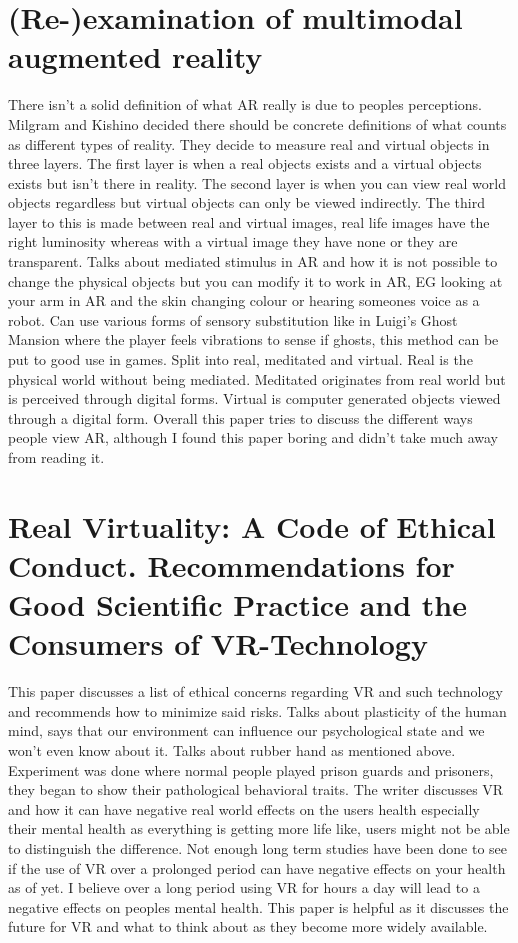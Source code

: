\documentclass{scrartcl}
\begin{document}
\section{(Re-)examination of multimodal augmented reality \cite{rosa2016re} }
There isn't a solid definition of what AR really is due to peoples perceptions. Milgram and Kishino decided there should be concrete definitions of what counts as different types of reality. They decide to measure real and virtual objects in three layers. The first layer is when a real objects exists and a virtual objects exists but isn't there in reality. The second layer is when you can view real world objects regardless but virtual objects can only be viewed indirectly. The third layer to this is made between real and virtual images, real life images have the right luminosity whereas with a virtual image they have none or they are transparent. Talks about mediated stimulus in AR and how it is not possible to change the physical objects but you can modify it to work in AR, EG looking at your arm in AR and the skin changing colour or hearing someones voice as a robot. Can use various forms of sensory substitution like in Luigi's Ghost Mansion where the player feels vibrations to sense if ghosts, this method can be put to good use in games. Split into real, meditated and virtual. Real is the physical world without being mediated. Meditated originates from real world but is perceived through digital forms. Virtual is computer generated objects viewed through a digital form. Overall this paper tries to discuss the different ways people view AR, although I found this paper boring and didn't take much away from reading it.

\section{Real Virtuality: A Code of Ethical Conduct. Recommendations for Good Scientific Practice and the Consumers of VR-Technology \cite{madary2016real} }
This paper discusses a list of ethical concerns regarding VR and such technology and recommends how to minimize said risks. Talks about plasticity of the human mind, says that our environment can influence our psychological state and we won't even know about it. Talks about rubber hand as mentioned above. Experiment was done where normal people played prison guards and prisoners, they began to show their pathological behavioral traits. The writer discusses VR and how it can have negative real world effects on the users health especially their mental health as everything is getting more life like, users might not be able to distinguish the difference. Not enough long term studies have been done to see if the use of VR over a prolonged period can have negative effects on your health as of yet. I believe over a long period using VR for hours a day will lead to a negative effects on peoples mental health. This paper is helpful as it discusses the future for VR and what to think about as they become more widely available.
\end{document}
